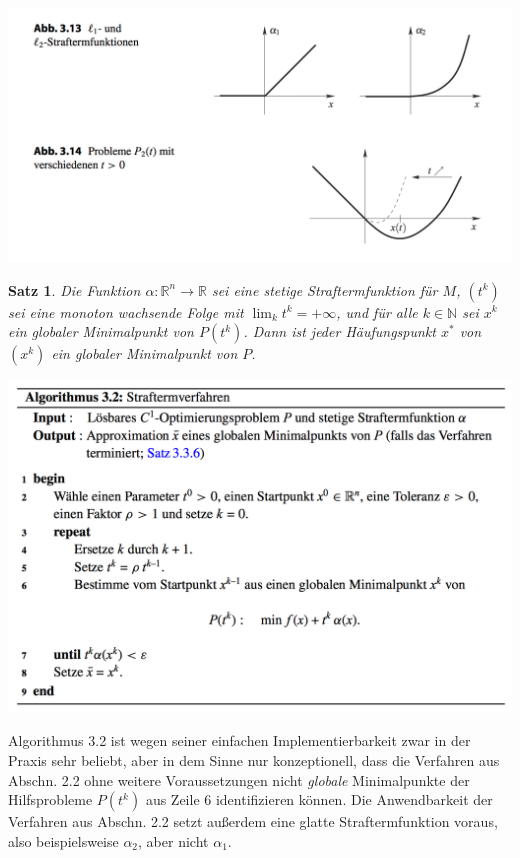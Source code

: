 \documentclass[11pt]{scrreprt}
\newcounter{thm}
\theoremstyle{thmstyle}
\numberwithin{thm}{section}
\newtheorem{satz}[thm]{Satz}
\begin{document}
\begin{center}
	\includegraphics[scale=0.5]{img/ab313}
\end{center}

\setcounter{thm}{5}

\begin{satz}
	Die Funktion $\alpha \colon \mathbb{R}^n \rightarrow \mathbb{R}$ sei eine stetige Straftermfunktion für $M$, $(t^k)$ sei eine monoton wachsende Folge mit $\lim_k t^k = +\infty$, und für alle $k \in \mathbb{N}$ sei $x^k$ ein globaler Minimalpunkt von $P(t^k)$. Dann ist jeder Häufungspunkt $x^*$ von $(x^k)$ ein globaler Minimalpunkt von $P$.
\end{satz}

\begin{center}
	\includegraphics[scale=0.5]{img/a32}
\end{center}

Algorithmus 3.2 ist wegen seiner einfachen Implementierbarkeit zwar in der Praxis sehr beliebt, aber in dem Sinne nur konzeptionell, dass die Verfahren aus Abschn. 2.2 ohne weitere Voraussetzungen nicht \textit{globale} Minimalpunkte der Hilfsprobleme $P(t^k)$ aus Zeile 6 identifizieren können. Die Anwendbarkeit der Verfahren aus Abschn. 2.2 setzt außerdem eine glatte Straftermfunktion voraus, also beispielsweise $\alpha_2$, aber nicht $\alpha_1$. \bigskip
\end{document}
